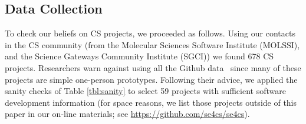 \documentclass[sigconf,review,anonymous]{acmart}
\begin{document}

 

 
 
\subsection{Data Collection}\label{tion:data}


To check our beliefs on CS projects, we proceeded as follows. 
Using our contacts in the CS community
(from the Molecular Sciences Software Institute (MOLSSI), and the Science Gateways Community Institute (SGCI)) we found
678 CS  projects.
Researchers
warn against using all the Github data~\cite{bird09promise,agrawal2018we, eirini15promise, munaiah17curating} since
many of these projects are simple one-person prototypes.
Following  their advice, we applied the sanity checks of Table \ref{tbl:sanity}
to select 59  projects with sufficient software development information
(for space reasons, we list those projects outside of this paper in our on-line materials; see \url{https://github.com/se4cs/se4cs}).
 
\end{document}
